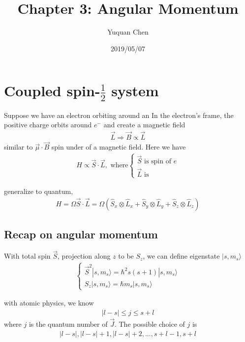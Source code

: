 \documentclass[UTF8,12pt]{article} %
\begin{document}
\title{Chapter 3: Angular Momentum}
\author{Yuquan Chen}
\date{2019/05/07} %
\maketitle

\section{Coupled spin-$\frac{1}{2}$ system}

Suppose we have an electron orbiting around an 
In the electron's frame, the positive charge orbits around $e^{-}$ and create a magnetic field
\begin{align}
\vec{L} \Rightarrow \vec{B} \propto \vec{L}
\end{align}
similar to $\vec{\mu}\cdot\vec{B}$ spin under of a magnetic field. Here we have
\begin{align}
H \propto \vec{S}\cdot\vec{L}, \text{ where}\begin{cases}\vec{S}\text{ is spin of }e\\\vec{L}\text{ is }\end{cases}
\end{align}


generalize to quantum,
\begin{align}
H = \Omega \vec{S}\cdot\vec{L} = \Omega \left(\hat{S}_{x}\otimes\hat{L}_{x} + \hat{S}_{y}\otimes\hat{L}_{y} + \hat{S}_{z}\otimes\hat{L}_{z}\right)
\end{align}

\subsection{Recap on angular momentum}

With total spin $\vec{S}$, projection along $z$ to be $S_{z}$, we can define eigenstate $|s,m_{s}\rangle$
\begin{align}
\begin{cases}\vec{S}^{2}|s,m_{s}\rangle = \hbar^{2}s(s+1)|s,m_{s}\rangle \\ S_{z}|s,m_{s}\rangle = \hbar m_{s}|s,m_{s}\rangle\end{cases}
\end{align}

with atomic physics, we know 
\begin{align}
|l-s| \le j \le s+l
\end{align}
where $j$ is the quantum number of $\vec{J}$. The possible choice of $j$ is
\begin{align}
|l-s|, |l-s|+1, |l-s|+2, ..., s+l-1, s+l
\end{align}
\end{document}
